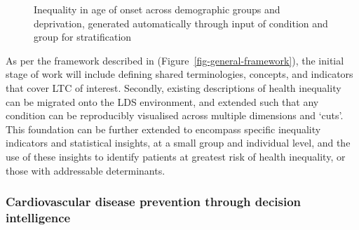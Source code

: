 \documentclass[
  letterpaper,
  DIV=11,
  numbers=noendperiod]{scrartcl}
\begin{document}
\begin{figure}


\caption{\label{fig-onset-time}Inequality in age of onset across
demographic groups and deprivation, generated automatically through
input of condition and group for stratification}

\end{figure}%

As per the framework described in (Figure~\ref{fig-general-framework}),
the initial stage of work will include defining shared terminologies,
concepts, and indicators that cover LTC of interest. Secondly, existing
descriptions of health inequality can be migrated onto the LDS
environment, and extended such that any condition can be reproducibly
visualised across multiple dimensions and `cuts'. This foundation can be
further extended to encompass specific inequality indicators and
statistical insights, at a small group and individual level, and the use
of these insights to identify patients at greatest risk of health
inequality, or those with addressable determinants.

\subsubsection{Cardiovascular disease prevention through decision
intelligence}\label{cardiovascular-disease-prevention-through-decision-intelligence}
\end{document}
